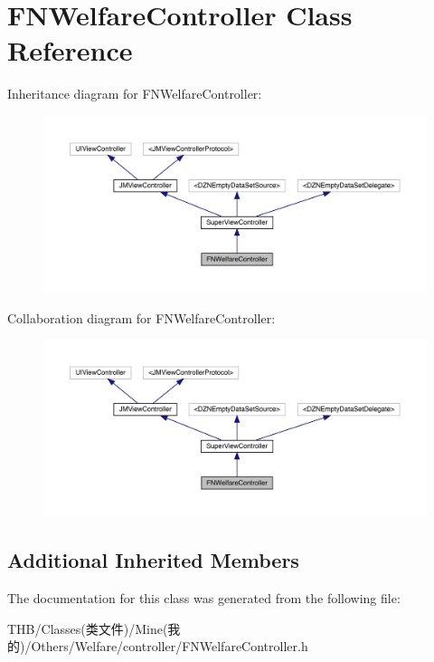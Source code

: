\hypertarget{interface_f_n_welfare_controller}{}\section{F\+N\+Welfare\+Controller Class Reference}
\label{interface_f_n_welfare_controller}


Inheritance diagram for F\+N\+Welfare\+Controller\+:\nopagebreak
\begin{figure}[H]
\begin{center}
\leavevmode
\includegraphics[width=350pt]{interface_f_n_welfare_controller__inherit__graph}
\end{center}
\end{figure}


Collaboration diagram for F\+N\+Welfare\+Controller\+:\nopagebreak
\begin{figure}[H]
\begin{center}
\leavevmode
\includegraphics[width=350pt]{interface_f_n_welfare_controller__coll__graph}
\end{center}
\end{figure}
\subsection*{Additional Inherited Members}


The documentation for this class was generated from the following file\+:\begin{DoxyCompactItemize}
\item 
T\+H\+B/\+Classes(类文件)/\+Mine(我的)/\+Others/\+Welfare/controller/F\+N\+Welfare\+Controller.\+h\end{DoxyCompactItemize}
